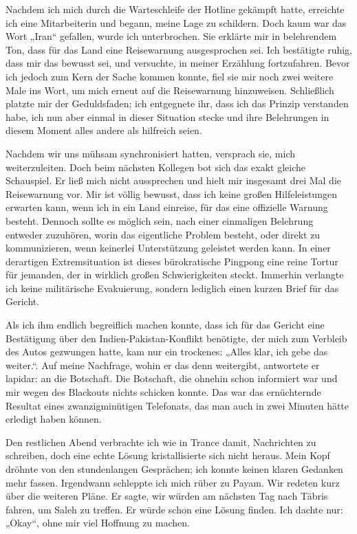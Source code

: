 Nachdem ich mich durch die Warteschleife der Hotline gekämpft hatte, erreichte ich eine Mitarbeiterin und begann, meine Lage zu schildern. Doch kaum war das Wort „Iran“ gefallen, wurde ich unterbrochen. Sie erklärte mir in belehrendem Ton, dass für das Land eine Reisewarnung ausgesprochen sei. Ich bestätigte ruhig, dass mir das bewusst sei, und versuchte, in meiner Erzählung fortzufahren. Bevor ich jedoch zum Kern der Sache kommen konnte, fiel sie mir noch zwei weitere Male ins Wort, um mich erneut auf die Reisewarnung hinzuweisen. Schließlich platzte mir der Geduldsfaden; ich entgegnete ihr, dass ich das Prinzip verstanden habe, ich nun aber einmal in dieser Situation stecke und ihre Belehrungen in diesem Moment alles andere als hilfreich seien.

Nachdem wir uns mühsam synchronisiert hatten, versprach sie, mich weiterzuleiten. Doch beim nächsten Kollegen bot sich das exakt gleiche Schauspiel. Er ließ mich nicht aussprechen und hielt mir insgesamt drei Mal die Reisewarnung vor. Mir ist völlig bewusst, dass ich keine großen Hilfeleistungen erwarten kann, wenn ich in ein Land einreise, für das eine offizielle Warnung besteht. Dennoch sollte es möglich sein, nach einer einmaligen Belehrung entweder zuzuhören, worin das eigentliche Problem besteht, oder direkt zu kommunizieren, wenn keinerlei Unterstützung geleistet werden kann. In einer derartigen Extremsituation ist dieses bürokratische Pingpong eine reine Tortur für jemanden, der in wirklich großen Schwierigkeiten steckt. Immerhin verlangte ich keine militärische Evakuierung, sondern lediglich einen kurzen Brief für das Gericht.

Als ich ihm endlich begreiflich machen konnte, dass ich für das Gericht eine Bestätigung über den Indien-Pakistan-Konflikt benötigte, der mich zum Verbleib des Autos gezwungen hatte, kam nur ein trockenes: „Alles klar, ich gebe das weiter.“. Auf meine Nachfrage, wohin er das denn weitergibt, antwortete er lapidar: an die Botschaft. Die Botschaft, die ohnehin schon informiert war und mir wegen des Blackouts nichts schicken konnte. Das war das ernüchternde Resultat eines zwanzigminütigen Telefonats, das man auch in zwei Minuten hätte erledigt haben können.

Den restlichen Abend verbrachte ich wie in Trance damit, Nachrichten zu schreiben, doch eine echte Lösung kristallisierte sich nicht heraus. Mein Kopf dröhnte von den stundenlangen Gesprächen; ich konnte keinen klaren Gedanken mehr fassen. Irgendwann schleppte ich mich rüber zu Payam. Wir redeten kurz über die weiteren Pläne. Er sagte, wir würden am nächsten Tag nach Täbris fahren, um Saleh zu treffen. Er würde schon eine Lösung finden. Ich dachte nur: „Okay“, ohne mir viel Hoffnung zu machen.

